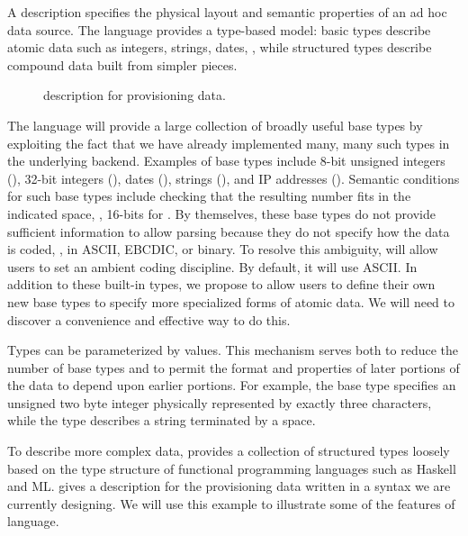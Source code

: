 \documentclass{entcs}
\begin{document}
A \datatype{} description specifies the physical layout and semantic
properties of an ad hoc data source.  The language provides a
type-based model: basic types describe atomic data such as integers,
strings, dates, \etc{}, while structured types describe compound data
built from simpler pieces.  \suppressfloats


\begin{figure}
\begin {code}

\end{code}
\caption{\datatype{} description for \dibbler{} provisioning data.}
\label{fig:dibblerml}
\end{figure}

The \datatype{} language will provide a large collection of broadly useful base
types by exploiting the fact that we have already implemented many,
many such types in the underlying \pads{} backend.  Examples of base
types include 8-bit unsigned integers (), 32-bit
integers (), dates (), strings (),
and IP addresses ().  Semantic conditions for such base types
include checking that the resulting number fits in the indicated
space, \ie, 16-bits for .  By themselves, these base types
do not provide sufficient information to allow parsing because they do
not specify how the data is coded, \ie{}, in ASCII, EBCDIC, or binary.
To resolve this ambiguity, \datatype{} will allow users to set an
ambient coding discipline.  By default, it will use ASCII.  In addition to
these built-in types, we propose to allow users to define their own new base 
types to specify more specialized forms of atomic data.  We
will need to discover a convenience and effective way to do this.

Types can be parameterized by values.  This mechanism serves
both to reduce the number of base types and to permit the format and
properties of later portions of the data to depend upon earlier
portions.  For example, the base type  specifies
an unsigned two byte integer physically represented by exactly three
characters, while the type  describes a string
terminated by a space.

To describe more complex data, \datatype{} provides a collection of
structured types loosely based on the type structure of functional
programming languages such as Haskell and ML.  
 gives a \datatype{} description for the
\dibbler{} provisioning data written in a syntax we are currently
designing.  We will use this example to illustrate some of the
features of \datatype{} language.  
\end{document}
